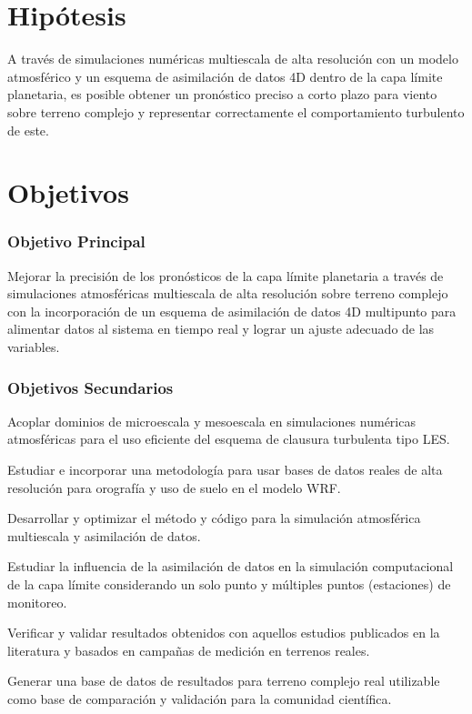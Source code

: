 \section{Hipótesis}
A través de simulaciones numéricas multiescala de alta resolución con un modelo atmosférico y un esquema de asimilación de datos 4D dentro de la capa límite planetaria, es posible obtener un pronóstico preciso a corto plazo para viento sobre terreno complejo y representar correctamente el comportamiento turbulento de este.

\section{Objetivos}
\subsubsection{Objetivo Principal}
\begin{itemize*}
	\item Mejorar la precisión de los pronósticos de la capa límite planetaria a través de simulaciones atmosféricas multiescala de alta resolución sobre terreno complejo con la incorporación de un esquema de asimilación de datos 4D multipunto para alimentar datos al sistema en tiempo real y lograr un ajuste adecuado de las variables.
\end{itemize*}
\subsubsection{Objetivos Secundarios}
\begin{itemize*}
	\item Acoplar dominios de microescala y mesoescala en simulaciones numéricas atmosféricas para el uso eficiente del esquema de clausura turbulenta tipo LES.
	\item Estudiar e incorporar una metodología para usar bases de datos reales de alta resolución para orografía y uso de suelo en el modelo WRF.
	\item Desarrollar y optimizar el método y código para la simulación atmosférica multiescala y asimilación de datos.
	\item Estudiar la influencia de la asimilación de datos en la simulación computacional de la capa límite considerando un solo punto y múltiples puntos (estaciones) de monitoreo.
	\item Verificar y validar resultados obtenidos con aquellos estudios publicados en la literatura y basados en campañas de medición en terrenos reales.
	\item Generar una base de datos de resultados para terreno complejo real utilizable como base de comparación y validación para la comunidad científica. 
\end{itemize*}
\newpage
